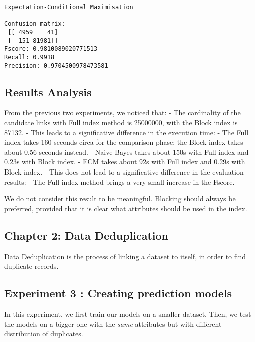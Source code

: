 \documentclass{article}
\begin{document}
    \begin{Verbatim}[commandchars=\\\{\}]
Expectation-Conditional Maximisation 

Confusion matrix: 
 [[ 4959    41]
 [  151 81981]]
Fscore: 0.9810089020771513
Recall: 0.9918
Precision: 0.9704500978473581

    \end{Verbatim}

    \hypertarget{results-analysis}{%
\subsection{Results Analysis}\label{results-analysis}}

From the previous two experiments, we noticed that: - The cardinality of
the candidate links with Full index method is 25000000, with the Block
index is 87132. - This leads to a significative difference in the
execution time: - The Full index takes 160 seconds circa for the
comparison phase; the Block index takes about 0.56 seconds instead. -
Naive Bayes takes about 150s with Full index and 0.23s with Block index.
- ECM takes about 92s with Full index and 0.29s with Block index. - This
does not lead to a significative difference in the evaluation results: -
The Full index method brings a very small increase in the Fscore.

We do not consider this result to be meaningful. Blocking should always
be preferred, provided that it is clear what attributes should be used
in the index.

    \hypertarget{chapter-2-data-deduplication}{%
\subsection{Chapter 2: Data
Deduplication}\label{chapter-2-data-deduplication}}

Data Deduplication is the process of linking a dataset to itself, in
order to find duplicate records.

    \hypertarget{experiment-3-creating-prediction-models}{%
\subsection{Experiment 3 : Creating prediction
models}\label{experiment-3-creating-prediction-models}}

In this experiment, we first train our models on a smaller dataset.
Then, we test the models on a bigger one with the \emph{same} attributes
but with different distribution of duplicates.
\end{document}

